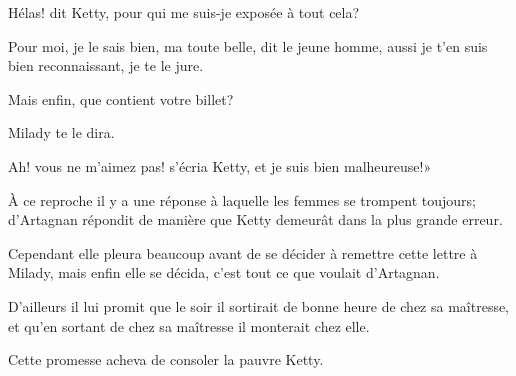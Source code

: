 \speak  Hélas! dit Ketty, pour qui me suis-je exposée à tout cela? 

\speak  Pour moi, je le sais bien, ma toute belle, dit le jeune homme, aussi je t'en suis bien reconnaissant, je te le jure. 

\speak  Mais enfin, que contient votre billet? 

\speak  Milady te le dira. 

\speak  Ah! vous ne m'aimez pas! s'écria Ketty, et je suis bien malheureuse!» 

À ce reproche il y a une réponse à laquelle les femmes se trompent toujours; d'Artagnan répondit de manière que Ketty demeurât dans la plus grande erreur. 

Cependant elle pleura beaucoup avant de se décider à remettre cette lettre à Milady, mais enfin elle se décida, c'est tout ce que voulait d'Artagnan. 

D'ailleurs il lui promit que le soir il sortirait de bonne heure de chez sa maîtresse, et qu'en sortant de chez sa maîtresse il monterait chez elle. 

Cette promesse acheva de consoler la pauvre Ketty. 